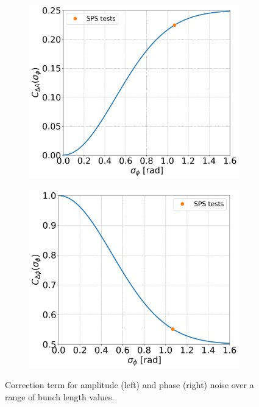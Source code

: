 \begin{figure}[!ht]
    \centering
    \begin{subfigure}[t]{0.45\textwidth}
        \centering
        \includegraphics[width=1\textwidth]{images/Ch3/CA_bunch_length_dependence.png}
    \end{subfigure}
    \hfill
    \begin{subfigure}[t]{0.45\textwidth}
        \centering
        \includegraphics[width=1\textwidth]{images/Ch3/Cphi_bunch_length_dependence.png}
    \end{subfigure}
    \hfill
     \caption{Correction term for amplitude (left) and phase (right) noise over a range of bunch length values.} %
     \label{fig:correction_term_bunch_length}
 \end{figure}

